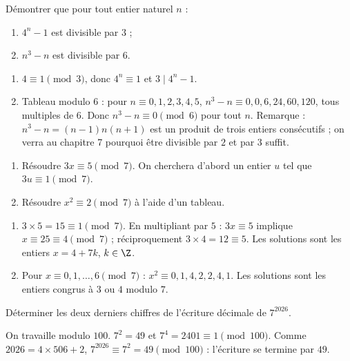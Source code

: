 \begin{exercise}
Démontrer que pour tout entier naturel $n$ :
\begin{enumerate}
\item $4^n-1$ est divisible par $3$ ;
\item $n^3-n$ est divisible par $6$.
\end{enumerate}
\end{exercise}
\begin{solution}
\begin{enumerate}
\item $4\equiv1\pmod3$, donc $4^n\equiv1$ et $3\mid4^n-1$.
\item Tableau modulo $6$ : pour $n\equiv0,1,2,3,4,5$, $n^3-n\equiv0,0,6,24,60,120$, tous multiples de $6$. Donc $n^3-n\equiv0\pmod6$ pour tout $n$. Remarque : $n^3-n=(n-1)n(n+1)$ est un produit de trois entiers consécutifs ; on verra au chapitre 7 pourquoi être divisible par $2$ et par $3$ suffit.
\end{enumerate}
\end{solution}

\begin{exercise}
\begin{enumerate}
\item Résoudre $3x\equiv5\pmod7$. On cherchera d'abord un entier $u$ tel que $3u\equiv1\pmod7$.
\item Résoudre $x^2\equiv2\pmod7$ à l'aide d'un tableau.
\end{enumerate}
\end{exercise}
\begin{solution}
\begin{enumerate}
\item $3\times5=15\equiv1\pmod7$. En multipliant par $5$ : $3x\equiv5$ implique $x\equiv25\equiv4\pmod7$ ; réciproquement $3\times4=12\equiv5$. Les solutions sont les entiers $x=4+7k$, $k\in\Z$.
\item Pour $x\equiv0,1,\dots,6\pmod7$ : $x^2\equiv0,1,4,2,2,4,1$. Les solutions sont les entiers congrus à $3$ ou $4$ modulo $7$.
\end{enumerate}
\end{solution}

\begin{exercise}
Déterminer les deux derniers chiffres de l'écriture décimale de $7^{2026}$.
\end{exercise}
\begin{solution}
On travaille modulo $100$. $7^2=49$ et $7^4=\num{2401}\equiv1\pmod{100}$. Comme $\num{2026}=4\times506+2$, $7^{2026}\equiv7^2=49\pmod{100}$ : l'écriture se termine par $49$.
\end{solution}

